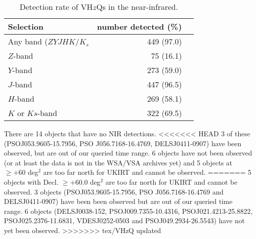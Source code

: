 \documentclass[usenatbib]{mnras}
\begin{document}
    \begin{table}
          \centering

      \begin{tabular}{l r l}
        \hline  \hline
        Selection   & number detected (\%) \\
        \hline  
        Any band ($ZYJHK/K_{s}$   &  449  (97.0) \\
        $Z$-band    &  75  (16.1) \\
        $Y$-band    &  273  (59.0) \\
        $J$-band    &  447  (96.5) \\
        $H$-band    &  269  (58.1) \\
        $K$ or $Ks$-band    &  322  (69.5) \\
        \hline  \hline
      \end{tabular}
      \caption{Detection rate of VH$z$Qs in the near-infrared.}
      \label{tab:nir_detection}
    \end{table}

  
     There are 14 objects that have no NIR detections. 
<<<<<<< HEAD
     3 of these (PSOJ053.9605-15.7956, PSO J056.7168-16.4769, DELSJ0411-0907) 
     have been observed, but are out of our queried time range. 
     6 objects have not been observed (or at least the data is not in the WSA/VSA 
     archives yet) and 5 objects at $\geq +60$ deg$^{2}$ are too far north for UKIRT 
     and cannot be observed. 
=======
     5 objects with Decl. $\geq +60.0$ deg$^{2}$ are too far north for UKIRT 
     and cannot be observed.
     3 objects (PSOJ053.9605-15.7956, PSO J056.7168-16.4769 and DELSJ0411-0907) 
     have been been observed %
     but are out of our queried time range. 
     6 objects 
     (DELSJ0038-152, PSOJ009.7355-10.4316,   PSOJ021.4213-25.8822, 
      PSOJ025.2376-11.6831, VDESJ0252-0503 and PSOJ049.2934-26.5543) 
      have not yet been observed. 
>>>>>>> tex/VHzQ updated
\end{document}
